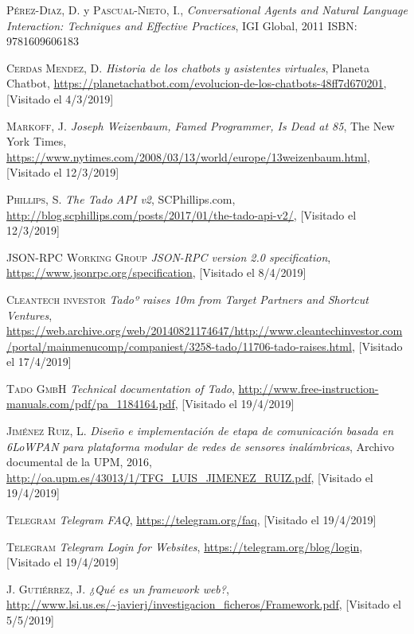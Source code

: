 \documentclass[spanish,12pt, a4paper, twoside]{paper}
\begin{document}
\begin{thebibliography}{00}
 \textsc{Pérez-Diaz, D.} y \textsc{Pascual-Nieto, I.},
	\textit{Conversational Agents and Natural Language Interaction: Techniques and Effective Practices}, IGI Global, 2011 ISBN: 9781609606183
	
 \textsc{Cerdas Mendez, D.}
	\textit{Historia de los chatbots y asistentes virtuales}, Planeta Chatbot, \url{https://planetachatbot.com/evolucion-de-los-chatbots-48ff7d670201}, [Visitado el 4/3/2019]
	
 \textsc{Markoff, J.}
	\textit{Joseph Weizenbaum, Famed Programmer, Is Dead at 85}, The New York Times, \url{https://www.nytimes.com/2008/03/13/world/europe/13weizenbaum.html}, [Visitado el 12/3/2019]
	
 \textsc{Phillips, S.}
	\textit{The Tado API v2}, SCPhillips.com, \url{http://blog.scphillips.com/posts/2017/01/the-tado-api-v2/}, [Visitado el 12/3/2019]
	
 \textsc{JSON-RPC Working Group} \textit{JSON-RPC version 2.0 specification}, \url{https://www.jsonrpc.org/specification}, [Visitado el 8/4/2019]

 \textsc{Cleantech investor} \textit{Tadoº raises \texteuro10m from Target Partners and Shortcut Ventures}, \url{https://web.archive.org/web/20140821174647/http://www.cleantechinvestor.com/portal/mainmenucomp/companiest/3258-tado/11706-tado-raises.html}, [Visitado el 17/4/2019]

 \textsc{Tado GmbH} \textit{Technical documentation of Tado}, \url{http://www.free-instruction-manuals.com/pdf/pa_1184164.pdf}, [Visitado el 19/4/2019]

 \textsc{Jiménez Ruiz, L.} \textit{Diseño e implementación de etapa de comunicación basada en 6LoWPAN para plataforma modular de redes de sensores inalámbricas}, Archivo documental de la UPM, 2016, \url{http://oa.upm.es/43013/1/TFG_LUIS_JIMENEZ_RUIZ.pdf}, [Visitado el 19/4/2019]

 \textsc{Telegram} \textit{Telegram FAQ}, \url{https://telegram.org/faq}, [Visitado el 19/4/2019]

 \textsc{Telegram} \textit{Telegram Login for Websites}, \url{https://telegram.org/blog/login}, [Visitado el 19/4/2019]

 \textsc{J. Gutiérrez, J.} \textit{¿Qué es un framework web?}, \url{http://www.lsi.us.es/~javierj/investigacion_ficheros/Framework.pdf}, [Visitado el 5/5/2019]


\end{thebibliography}
\end{document}
